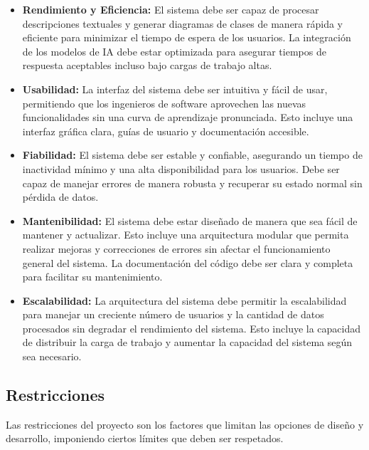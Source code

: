 \begin{itemize}
	\item \textbf{Rendimiento y Eficiencia:}
	El sistema debe ser capaz de procesar descripciones textuales y generar diagramas de clases de manera rápida y eficiente para minimizar el tiempo de espera de los usuarios. La integración de los modelos de IA debe estar optimizada para asegurar tiempos de respuesta aceptables incluso bajo cargas de trabajo altas.
	
	\item \textbf{Usabilidad:}
	La interfaz del sistema debe ser intuitiva y fácil de usar, permitiendo que los ingenieros de software aprovechen las nuevas funcionalidades sin una curva de aprendizaje pronunciada. Esto incluye una interfaz gráfica clara, guías de usuario y documentación accesible.
	
	\item \textbf{Fiabilidad:}
	El sistema debe ser estable y confiable, asegurando un tiempo de inactividad mínimo y una alta disponibilidad para los usuarios. Debe ser capaz de manejar errores de manera robusta y recuperar su estado normal sin pérdida de datos.
	
	\item \textbf{Mantenibilidad:}
	El sistema debe estar diseñado de manera que sea fácil de mantener y actualizar. Esto incluye una arquitectura modular que permita realizar mejoras y correcciones de errores sin afectar el funcionamiento general del sistema. La documentación del código debe ser clara y completa para facilitar su mantenimiento.
	
	\item \textbf{Escalabilidad:}
	La arquitectura del sistema debe permitir la escalabilidad para manejar un creciente número de usuarios y la cantidad de datos procesados sin degradar el rendimiento del sistema. Esto incluye la capacidad de distribuir la carga de trabajo y aumentar la capacidad del sistema según sea necesario.
\end{itemize}

\subsection{Restricciones}

Las restricciones del proyecto son los factores que limitan las opciones de diseño y desarrollo, imponiendo ciertos límites que deben ser respetados.

